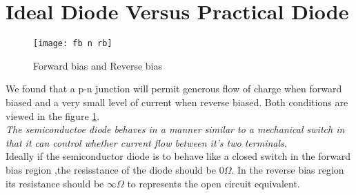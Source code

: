 \section{Ideal Diode Versus Practical Diode}
\begin{figure}[H]
\centering
\texttt{[image: fb n rb]}
\caption{Forward bias and  Reverse bias}
\label{fb n rb}
\end{figure}
We found that a p-n junction will permit generous flow of charge when forward biased and a very small level of current when reverse biased. Both conditions are viewed in the figure \ref{fb n rb}.\\ \textit{The semiconductoe diode behaves in a manner similar to a mechanical switch in that it can control whether current flow between it's two terminals.}\\
Ideally if the semiconductor diode is to behave like a closed switch in the forward bias region ,the resisstance of the diode should be $ 0\Omega$. In the reverse bias region its resistance should be $ \infty\Omega$ to represents the open circuit equivalent.

